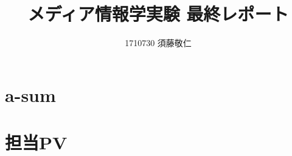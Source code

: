 \documentclass[12pt, a4j]{jsarticle}
\title{メディア情報学実験 最終レポート}
\author{1710730 須藤敬仁}
\date{}
\begin{document}
  \maketitle
  \section{a-sum}

  \section{担当PV}

  \section{}
\end{document}
